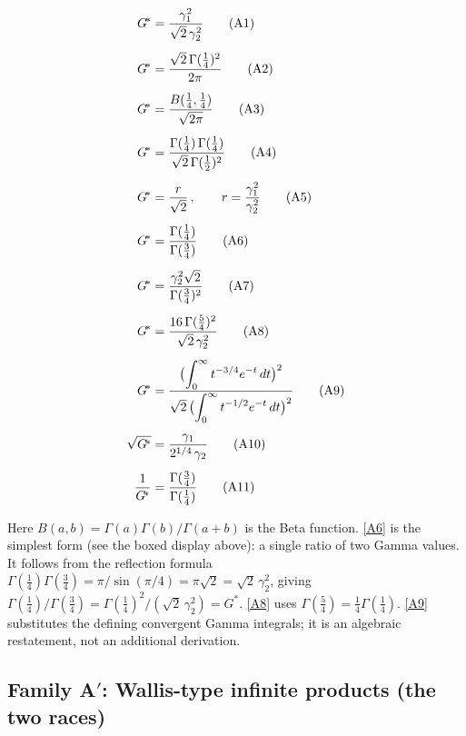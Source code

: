 \documentclass[12pt,reqno]{amsart}
\theoremstyle{definition}
\theoremstyle{remark}
\newcommand{\Gstar}{G^{\!*}}
\begin{document}
\begin{align}
  {\Gstar} &= \frac{\gamma_{1}^{2}}{\sqrt{2}\,\gamma_{2}^{2}}
    \tag{A1}\label{A1}\\[5pt]
  {\Gstar} &= \frac{\sqrt{2}\,\Gamma(\tfrac14)^{2}}{2\pi}
    \tag{A2}\label{A2}\\[5pt]
  {\Gstar} &= \frac{B(\tfrac14,\tfrac14)}{\sqrt{2\pi}}
    \tag{A3}\label{A3}\\[5pt]
  {\Gstar} &= \frac{\Gamma(\tfrac14)\,\Gamma(\tfrac14)}
    {\sqrt{2}\,\Gamma(\tfrac12)^{2}}
    \tag{A4}\label{A4}\\[5pt]
  {\Gstar} &= \frac{r}{\sqrt{2}}\,,\qquad
    r = \frac{\gamma_{1}^{2}}{\gamma_{2}^{2}}
    \tag{A5}\label{A5}\\[5pt]
  {\Gstar} &= \frac{\Gamma(\tfrac14)}{\Gamma(\tfrac34)}
    \tag{A6}\label{A6}\\[5pt]
  {\Gstar} &= \frac{\gamma_{2}^{2}\sqrt{2}}{\Gamma(\tfrac34)^{2}}
    \tag{A7}\label{A7}\\[5pt]
  {\Gstar} &= \frac{16\,\Gamma(\tfrac54)^{2}}
    {\sqrt{2}\,\gamma_{2}^{2}}
    \tag{A8}\label{A8}\\[5pt]
  {\Gstar} &= \frac{\bigl(\displaystyle\int_{0}^{\infty}
    t^{-3/4}e^{-t}\,dt\bigr)^{2}}{%
    \sqrt{2}\,\bigl(\displaystyle\int_{0}^{\infty}
    t^{-1/2}e^{-t}\,dt\bigr)^{2}}
    \tag{A9}\label{A9}\\[5pt]
  \sqrt{{\Gstar}} &= \frac{\gamma_{1}}{2^{1/4}\,\gamma_{2}}
    \tag{A10}\label{A10}\\[5pt]
  \frac{1}{{\Gstar}} &= \frac{\Gamma(\tfrac34)}{\Gamma(\tfrac14)}
    \tag{A11}\label{A11}
\end{align}

\noindent
Here $B(a,b)=\Gamma(a)\Gamma(b)/\Gamma(a+b)$ is the Beta function.
\eqref{A6} is the simplest form (see the boxed display above):
a single ratio of two Gamma values.
It follows from the reflection formula
$\Gamma(\tfrac14)\Gamma(\tfrac34)=\pi/\!\sin(\pi/4)=\pi\sqrt{2}
=\sqrt{2}\,\gamma_{2}^{2}$, giving
$\Gamma(\tfrac14)/\Gamma(\tfrac34)
=\Gamma(\tfrac14)^{2}/(\sqrt{2}\,\gamma_{2}^{2})={\Gstar}$.
\eqref{A8} uses $\Gamma(\tfrac54)=\tfrac14\Gamma(\tfrac14)$.
\eqref{A9} substitutes the defining convergent Gamma integrals; it is an
algebraic restatement, not an additional derivation.

\subsection{Family \texorpdfstring{A$'$}{A'}: Wallis-type infinite products (the two races)}\label{sec:Aprime}
\end{document}
